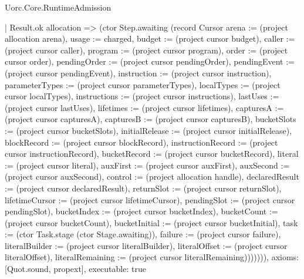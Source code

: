 \begin{lexlean}{Uorc.Core.RuntimeAdmission}
\begin{semanticmodule}
{        | Result.ok allocation => (ctor Step.awaiting (record Cursor {arena := (project allocation arena), usage := charged, budget := (project cursor budget), caller := (project cursor caller), program := (project cursor program), order := (project cursor order), pendingOrder := (project cursor pendingOrder), pendingEvent := (project cursor pendingEvent), instruction := (project cursor instruction), parameterTypes := (project cursor parameterTypes), localTypes := (project cursor localTypes), instructions := (project cursor instructions), lastUses := (project cursor lastUses), lifetimes := (project cursor lifetimes), capturesA := (project cursor capturesA), capturesB := (project cursor capturesB), bucketSlots := (project cursor bucketSlots), initialRelease := (project cursor initialRelease), blockRecord := (project cursor blockRecord), instructionRecord := (project cursor instructionRecord), bucketRecord := (project cursor bucketRecord), literal := (project cursor literal), auxFirst := (project cursor auxFirst), auxSecond := (project cursor auxSecond), control := (project allocation handle), declaredResult := (project cursor declaredResult), returnSlot := (project cursor returnSlot), lifetimeCursor := (project cursor lifetimeCursor), pendingSlot := (project cursor pendingSlot), bucketIndex := (project cursor bucketIndex), bucketCount := (project cursor bucketCount), bucketInitial := (project cursor bucketInitial), task := (ctor Task.stage (ctor Stage.awaiting)), failure := (project cursor failure), literalBuilder := (project cursor literalBuilder), literalOffset := (project cursor literalOffset), literalRemaining := (project cursor literalRemaining)})))))),
  axioms: [Quot.sound, propext],
  executable: true
}


\end{semanticmodule}
\end{lexlean}

